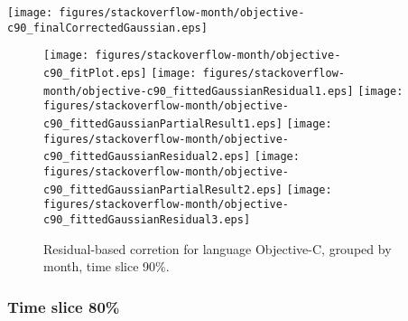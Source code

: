 \begin{center}
{\texttt{[image: figures/stackoverflow-month/objective-c90\_finalCorrectedGaussian.eps]}}
\end{center}

\FloatBarrier

\begin{figure}[t]
\centering
{}
{\texttt{[image: figures/stackoverflow-month/objective-c90\_fitPlot.eps]}}
{\texttt{[image: figures/stackoverflow-month/objective-c90\_fittedGaussianResidual1.eps]}}
{\texttt{[image: figures/stackoverflow-month/objective-c90\_fittedGaussianPartialResult1.eps]}}
{\texttt{[image: figures/stackoverflow-month/objective-c90\_fittedGaussianResidual2.eps]}}
{\texttt{[image: figures/stackoverflow-month/objective-c90\_fittedGaussianPartialResult2.eps]}}
{\texttt{[image: figures/stackoverflow-month/objective-c90\_fittedGaussianResidual3.eps]}}
\caption{Residual-based corretion for language Objective-C, grouped by month, time slice 90\%.}
\end{figure}


\FloatBarrier


\subsubsection{Time slice 80\%}

